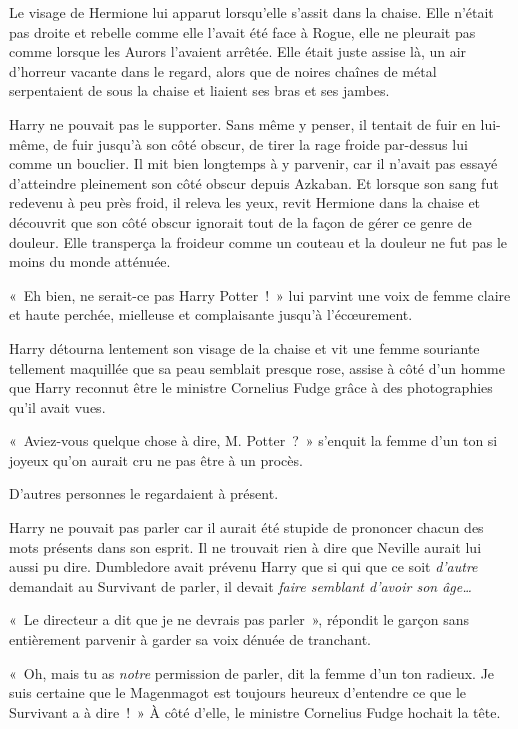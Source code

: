 Le visage de Hermione lui apparut lorsqu'elle s'assit dans la chaise.
Elle n'était pas droite et rebelle comme elle l'avait été face à Rogue, elle ne pleurait pas comme lorsque les Aurors l'avaient arrêtée.
Elle était juste assise là, un air d'horreur vacante dans le regard, alors que de noires chaînes de métal serpentaient de sous la chaise et liaient ses bras et ses jambes.

Harry ne pouvait pas le supporter.
Sans même y penser, il tentait de fuir en lui-même, de fuir jusqu'à son côté obscur, de tirer la rage froide par-dessus lui comme un bouclier.
Il mit bien longtemps à y parvenir, car il n'avait pas essayé d'atteindre pleinement son côté obscur depuis Azkaban.
Et lorsque son sang fut redevenu à peu près froid, il releva les yeux, revit Hermione dans la chaise et découvrit que son côté obscur ignorait tout de la façon de gérer ce genre de douleur.
Elle transperça la froideur comme un couteau et la douleur ne fut pas le moins du monde atténuée.

«~Eh bien, ne serait-ce pas Harry Potter~!~»
lui parvint une voix de femme claire et haute perchée, mielleuse et complaisante jusqu'à l'écœurement.

Harry détourna lentement son visage de la chaise et vit une femme souriante tellement maquillée que sa peau semblait presque rose, assise à côté d'un homme que Harry reconnut être le ministre Cornelius Fudge grâce à des photographies qu'il avait vues.

«~Aviez-vous quelque chose à dire, M. Potter~?~»
s'enquit la femme d'un ton si joyeux qu'on aurait cru ne pas être à un procès.

D'autres personnes le regardaient à présent.

Harry ne pouvait pas parler car il aurait été stupide de prononcer chacun des mots présents dans son esprit.
Il ne trouvait rien à dire que Neville aurait lui aussi pu dire.
Dumbledore avait prévenu Harry que si qui que ce soit \emph{d'autre} demandait au Survivant de parler, il devait \emph{faire semblant d'avoir son âge…}

«~Le directeur a dit que je ne devrais pas parler~», répondit le garçon sans entièrement parvenir à garder sa voix dénuée de tranchant.

«~Oh, mais tu as \emph{notre} permission de parler, dit la femme d'un ton radieux.
Je suis certaine que le Magenmagot est toujours heureux d'entendre ce que le Survivant a à dire~!~»
À côté d'elle, le ministre Cornelius Fudge hochait la tête.

